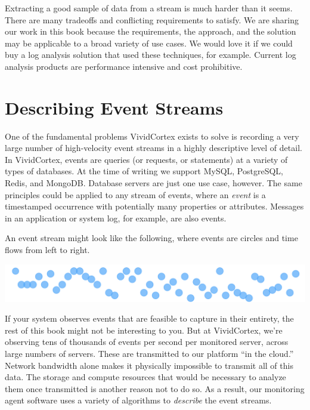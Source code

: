 \documentclass{vivid_layout}
\begin{document}
Extracting a good sample of data from a stream is much harder than it seems.
There are many tradeoffs and conflicting requirements to satisfy. We are sharing
our work in this book because the requirements, the approach, and the solution
may be applicable to a broad variety of use cases. We would love it if we could
buy a log analysis solution that used these techniques, for example. Current log
analysis products are performance intensive and cost prohibitive.

\newpage

\section{Describing Event Streams}

One of the fundamental problems VividCortex exists to solve is recording a very
large number of high-velocity event streams in a highly descriptive level of
detail. In VividCortex, events are queries (or requests, or statements) at a
variety of types of databases. At the time of writing we support MySQL,
PostgreSQL, Redis, and MongoDB. Database servers are just one use case, however.
The same principles could be applied to any stream of events, where an
\emph{event} is a timestamped occurrence with potentially many properties or
attributes. Messages in an application or system log, for example, are also
events.

An event stream might look like the following, where events are circles and time
flows from left to right.

\begin{center}
\includegraphics[width=.85\linewidth]{sketch-sampling/event-stream}
\end{center}

If your system observes events that are feasible to capture in their entirety,
the rest of this book might not be interesting to you. But at VividCortex, we're
observing tens of thousands of events per second per monitored server, across large
numbers of servers. These are transmitted to our platform ``in the cloud.''
Network bandwidth alone makes it physically impossible to transmit all of this
data. The storage and compute resources that would be necessary to analyze them
once transmitted is another reason not to do so. As a result, our monitoring
agent software uses a variety of algorithms to \emph{describe} the event
streams.
\end{document}
